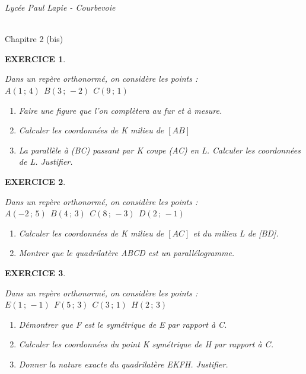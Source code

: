 \documentclass[a4paper]{article}   %
\renewcommand{\(}{\left(}
\renewcommand{\)}{\right)}
\newtheorem{EXO}{\large EXERCICE }
\newenvironment{EX}   { \setcounter{ques}{0} \begin{EXO} \hrulefill ~\vspace{0.3cm}

\normalfont}    {\end{EXO} \medskip}
\def\cl{{\Large \bf{2nde}}}
\begin{document}
\newpage \setcounter{EXO}{0}
\noindent\begin{minipage}{.20\linewidth}\begin{center}                  
\noindent \emph{Lycée Paul Lapie - Courbevoie}
\end{center}\end{minipage}
\begin{minipage}{1.5\linewidth}\begin{center}	
\noindent \cl\\ Chapitre 2 (bis)
\end{center}\end{minipage}

\begin{center} 	
\end{center}

\begin{EX} Dans un repère orthonormé, on considère les points : $A(1\,;\,4) ~~ B(3\,;\,-2)~~C(9\,;\,1)$
 \begin{enumerate}
\item Faire une figure que l'on complètera au fur et à mesure.
\item Calculer les coordonnées de K milieu de $[AB]$
\item La parallèle à (BC) passant par K coupe (AC) en L. Calculer les coordonnées de L. Justifier.
\end{enumerate}

\end{EX}


\begin{EX}  Dans un repère orthonormé, on considère les points : $A(-2\,;\,5) ~~ B(4\,;\,3)~~C(8\,;\,-3)~~D(2\,;\,-1)$
 \begin{enumerate}
\item Calculer les coordonnées de K milieu de $[AC]$ et du milieu L de [BD].
\item Montrer que le quadrilatère ABCD est un parallélogramme.
\end{enumerate}
\end{EX}


\begin{EX}  Dans un repère orthonormé, on considère les points : $E(1\,;\,-1) ~~ F(5\,;\,3)~~C(3\,;\,1)~~H(2\,;\,3)$
 \begin{enumerate}
\item Démontrer que F est le symétrique de E par rapport à C.
\item Calculer les coordonnées du point K symétrique de H par rapport à C.
\item Donner la nature exacte du quadrilatère EKFH. Justifier.
\end{enumerate}
\end{EX}
\end{document}
